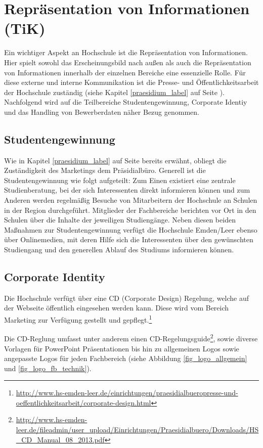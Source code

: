 \section{Repräsentation von Informationen (TiK)}
Ein wichtiger Aspekt an Hochschule ist die Repräsentation von Informationen. Hier spielt sowohl das Erscheinungsbild nach außen als auch die Repräsentation von Informationen innerhalb der einzelnen Bereiche eine essenzielle Rolle. Für diese externe und interne Kommunikation ist die Presse- und Öffentlichkeitsarbeit der Hochschule zuständig (siehe Kapitel \ref{praesidium_label} auf Seite \pageref{praesidium_label}). Nachfolgend wird auf die Teilbereiche   Studentengewinnung, Corporate Identiy und das Handling von Bewerberdaten näher Bezug genommen. 

\subsection{Studentengewinnung}
Wie in Kapitel \ref{praesidium_label} auf Seite \pageref{praesidium_label} bereits erwähnt, obliegt die Zuständigkeit des Marketings dem Präsidialbüro. Generell ist die Studentengewinnung wie folgt aufgeteilt: Zum Einen existiert eine zentrale Studienberatung, bei der sich Interessenten direkt informieren können und zum Anderen werden regelmäßig Besuche von Mitarbeitern der Hochschule an Schulen in der Region durchgeführt. Mitglieder der Fachbereiche berichten vor Ort in den Schulen über die Inhalte der jeweiligen Studiengänge. Neben diesen beiden Maßnahmen zur Studentengewinnung verfügt die Hochschule Emden/Leer ebenso über Onlinemedien, mit deren Hilfe sich die Interessenten über den gewünschten Studiengang und den generellen Ablauf des  Studiums informieren können. 


\subsection{Corporate Identity}
Die Hochschule verfügt über eine CD (Corporate Design) Regelung, welche auf der Webseite öffentlich eingesehen werden kann. Diese wird vom Bereich Marketing zur Verfügung gestellt und gepflegt.\footnote{\url{http://www.hs-emden-leer.de/einrichtungen/praesidialbueropresse-und-oeffentlichkeitsarbeit/corporate-design.html}}

Die CD-Reglung umfasst unter anderem einen CD-Regelungsguide\footnote{\url{http://www.hs-emden-leer.de/fileadmin/user_upload/Einrichtungen/Praesidialbuero/Downloads/HS_CD_Manual_08_2013.pdf}}, sowie diverse Vorlagen für PowerPoint Präsentationen bis hin zu allgemeinen Logos sowie angepasste Logos für jeden Fachbereich (siehe Abbildung \ref{fig_logo_allgemein} und \ref{fig_logo_fb_technik}).

